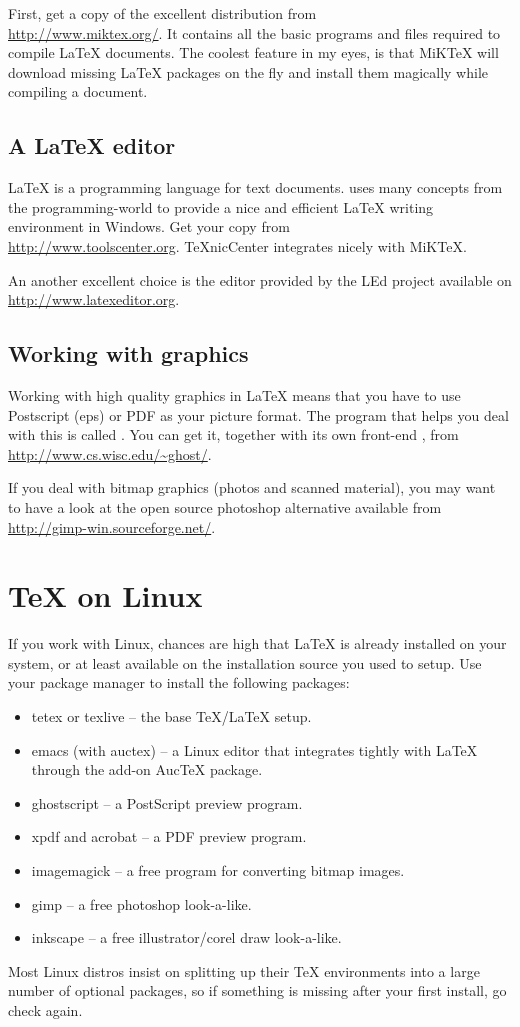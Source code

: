 First, get a copy of the excellent  distribution from\\
\url{http://www.miktex.org/}. It contains all the basic programs and files
required to compile \LaTeX{} documents.  The coolest feature in my eyes, is
that MiKTeX will download missing \LaTeX{} packages on the fly and install them
magically while compiling a document.

\subsection{A \LaTeX{} editor}

\LaTeX{} is a programming language for text documents. 
uses many concepts from the programming-world to provide a nice and
efficient \LaTeX{} writing environment in Windows. Get your copy from\\
\url{http://www.toolscenter.org}. TeXnicCenter integrates nicely with
MiKTeX.

An another excellent choice is the editor provided by the LEd project available on
\url{http://www.latexeditor.org}.

\subsection{Working with graphics}

Working with high quality graphics in \LaTeX{} means that you have to use
Postscript (eps) or PDF as your picture format. The program that helps you
deal with this is called . You can get it, together with its
own front-end , from \url{http://www.cs.wisc.edu/~ghost/}.

If you deal with bitmap graphics (photos and scanned material), you may want
to have a look at the open source photoshop alternative  available
from \url{http://gimp-win.sourceforge.net/}.

\section{\TeX{} on Linux}

If you work with Linux, chances are high that \LaTeX{} is already installed
on your system, or at least available on the installation source you used to
setup. Use your package manager to install the following packages:

\begin{itemize}
\item tetex or texlive -- the base \TeX{}/\LaTeX{} setup.
\item emacs (with auctex) -- a Linux editor that integrates tightly with \LaTeX{} through the add-on AucTeX package.
\item ghostscript -- a PostScript preview program.
\item xpdf and acrobat -- a PDF preview program.
\item imagemagick -- a free program for converting bitmap images.
\item gimp -- a free photoshop look-a-like.
\item inkscape -- a free illustrator/corel draw look-a-like.
\end{itemize}

Most Linux distros insist on splitting up their \TeX{} environments into a
large number of optional packages, so if something is missing after your
first install, go check again.
